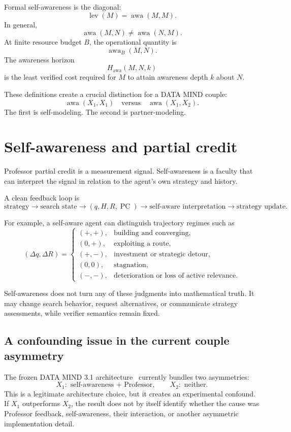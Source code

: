 \documentclass[11pt]{article}
\theoremstyle{definition}
\theoremstyle{remark}
\newcommand{\PC}{\operatorname{PC}}
\newcommand{\awa}{\operatorname{awa}}
\newcommand{\lev}{\operatorname{lev}}
\begin{document}
Formal self-awareness is the diagonal:
\[
\boxed{\lev(M)=\awa(M,M).}
\]
In general,
\[
\awa(M,N)\ne\awa(N,M).
\]
At finite resource budget $B$, the operational quantity is
\[
\awa_B(M,N).
\]
The awareness horizon
\[
\boxed{H_{\mathrm{awa}}(M,N,k)}
\]
is the least verified cost required for $M$ to attain awareness depth $k$ about $N$.

These definitions create a crucial distinction for a DATA MIND couple:
\[
\awa(X_1,X_1)
\quad\text{versus}\quad
\awa(X_1,X_2).
\]
The first is self-modeling. The second is partner-modeling.

\section{Self-awareness and partial credit}

Professor partial credit is a measurement signal. Self-awareness is a faculty that can interpret the signal in relation to the agent's own strategy and history.

A clean feedback loop is
\[
\boxed{
\text{strategy}
\longrightarrow
\text{search state}
\longrightarrow
(q,H,R,\PC)
\longrightarrow
\text{self-aware interpretation}
\longrightarrow
\text{strategy update}.
}
\]

For example, a self-aware agent can distinguish trajectory regimes such as
\[
(\Delta q,\Delta R)=
\begin{cases}
(+,+), & \text{building and converging},\\
(0,+), & \text{exploiting a route},\\
(+,-), & \text{investment or strategic detour},\\
(0,0), & \text{stagnation},\\
(-,-), & \text{deterioration or loss of active relevance}.
\end{cases}
\]

Self-awareness does not turn any of these judgments into mathematical truth. It may change search behavior, request alternatives, or communicate strategy assessments, while verifier semantics remain fixed.

\subsection{A confounding issue in the current couple asymmetry}

The frozen DATA MIND 3.1 architecture~\cite{snapshot} currently bundles two asymmetries:
\[
X_1:\text{ self-awareness + Professor},
\qquad
X_2:\text{ neither}.
\]
This is a legitimate architecture choice, but it creates an experimental confound. If $X_1$ outperforms $X_2$, the result does not by itself identify whether the cause was Professor feedback, self-awareness, their interaction, or another asymmetric implementation detail.
\end{document}

